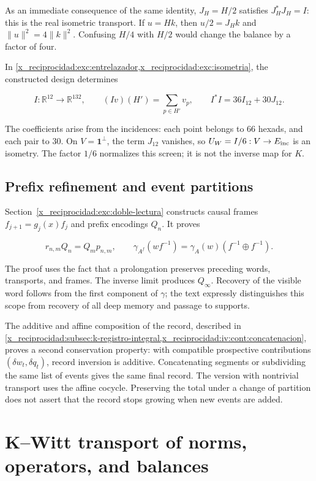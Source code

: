 As an immediate consequence of the same identity, \(J_H=H/2\) satisfies \(J_H^*J_H=I\): this is the real isometric transport. If \(u=Hk\), then \(u/2=J_Hk\) and \(\|u\|^2=4\|k\|^2\). Confusing \(H/4\) with \(H/2\) would change the balance by a factor of four.

In \cref{x_reciprocidad:exc:entrelazador,x_reciprocidad:exc:isometria}, the constructed design determines

\[
I:\mathbb R^{12}\to\mathbb R^{132},\qquad
(Iv)(H')=\sum_{p\in H'}v_p,\qquad I^*I=36I_{12}+30J_{12}.
\]

The coefficients arise from the incidences: each point belongs to 66 hexads, and each pair to 30. On \(V=\mathbf1^\perp\), the term \(J_{12}\) vanishes, so \(U_W=I/6:V\to E_{\rm inc}\) is an isometry. The factor \(1/6\) normalizes this screen; it is not the inverse map for \(K\).

\subsection{Prefix refinement and event partitions}

Section~\ref{x_reciprocidad:exc:doble-lectura} constructs causal frames \(f_{j+1}=g_j(x)f_j\) and prefix encodings \(Q_n\). It proves

\[
r_{n,m}Q_n=Q_mp_{n,m},\qquad
\gamma_{A^f}(wf^{-1})=\gamma_A(w)(f^{-1}\oplus f^{-1}).
\]

The proof uses the fact that a prolongation preserves preceding words, transports, and frames. The inverse limit produces \(Q_\infty\). Recovery of the visible word follows from the first component of \(\gamma\); the text expressly distinguishes this scope from recovery of all deep memory and passage to supports.

The additive and affine composition of the record, described in \cref{x_reciprocidad:subsec:k-registro-integral,x_reciprocidad:iv:cont:concatenacion}, proves a second conservation property: with compatible prospective contributions \((\delta w_t,\delta q_t)\), record inversion is additive. Concatenating segments or subdividing the same list of events gives the same final record. The version with nontrivial transport uses the affine cocycle. Preserving the total under a change of partition does not assert that the record stops growing when new events are added.

\section{K–Witt transport of norms, operators, and balances}\label{x_reciprocidad:nuc04:kwitt}

